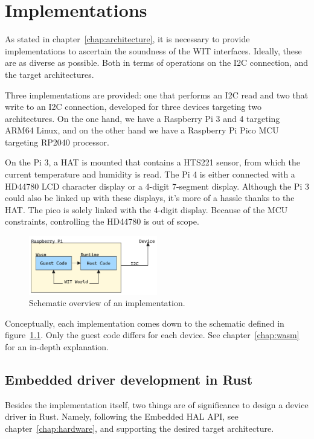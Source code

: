 \chapter{Implementations}
\label{chap:implementation}
As stated in chapter~\ref{chap:architecture}, it is necessary to provide implementations to ascertain the soundness of the \gls{WIT} interfaces. Ideally, these are as diverse as possible. Both in terms of operations on the \gls{I2C} connection, and the target architectures.

Three implementations are provided: one that performs an \gls{I2C} read and two that write to an \gls{I2C} connection, developed for three devices targeting two architectures. 
On the one hand, we have a Raspberry Pi 3 and 4 targeting ARM64 Linux, and on the other hand we have a Raspberry Pi Pico \gls{MCU} targeting RP2040 processor.

On the Pi 3, a \gls{HAT} is mounted that contains a HTS221 sensor, from which the current temperature and humidity is read. The Pi 4 is either connected with a HD44780 LCD character display or a 4-digit 7-segment display. 
Although the Pi 3 could also be linked up with these displays, it's more of a hassle thanks to the \gls{HAT}. The pico is solely linked with the 4-digit display. Because of the \gls{MCU} constraints, controlling the HD44780 is out of scope.

\begin{figure}[h]
    \centering
    \includegraphics[width=0.5\textwidth]{figures/schema.png}
    \caption{Schematic overview of an implementation.}
    \label{fig:schematic}
\end{figure}

Conceptually, each implementation comes down to the schematic defined in figure~\ref{fig:schematic}. Only the guest code differs for each device. See chapter~\ref{chap:wasm} for an in-depth explanation.


\section{Embedded driver development in Rust}
Besides the implementation itself, two things are of significance to design a device driver in Rust. Namely, following the Embedded \gls{HAL} \gls{API}, see chapter~\ref{chap:hardware}, and supporting the desired target architecture.

